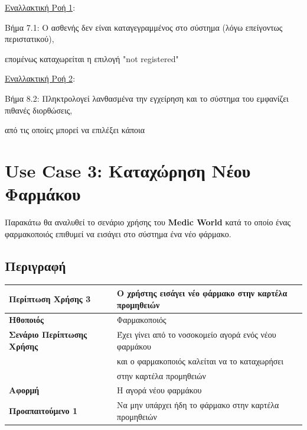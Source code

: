 \documentclass{article}
\newcommand\T{\rule{0pt}{2.6ex}}       %
\newcommand\B{\rule[-1.2ex]{0pt}{0pt}}
\begin{document}
\newpage
 
\underline{Εναλλακτική Ροή 1}: \vspace{0.005cm} \\
\par Βήμα 7.1: O ασθενής δεν είναι καταγεγραμμένος στο σύστημα (λόγω επείγοντως περιστατικού), \par επομένως καταχωρείται η επιλογή "not registered"

\vspace{0.3cm}

\underline{Εναλλακτική Ροή 2}: \vspace{0.005cm} \\
\par Βήμα 8.2: Πληκτρολογεί λανθασμένα την εγχείρηση και το σύστημα του εμφανίζει πιθανές διορθώσεις, \par από τις οποίες μπορεί να επιλέξει κάποια 

 

\section{Use Case 3: Καταχώρηση Νέου Φαρμάκου }
 
 Παρακάτω θα αναλυθεί το σενάριο χρήσης του \textbf{Medic World} κατά το οποίο ένας φαρμακοποιός επιθυμεί να εισάγει στο σύστημα ένα νέο φάρμακο.
 
\subsection{Περιγραφή}

\begin{center}
     \begin{tabular}{|l|l|}
     \hline
      \textbf{Περίπτωση Χρήσης 3} & Ο χρήστης εισάγει νέο φάρμακο στην καρτέλα προμηθειών \T\B \\ 
      \hline
      \textbf{Ηθοποιός} & Φαρμακοποιός \T\B \\
      \hline
      \textbf{Σενάριο Περίπτωσης Χρήσης} & Έχει γίνει από το νοσοκομείο αγορά ενός νέου φαρμάκου \T \\& και ο φαρμακοποιός καλείται να το καταχωρήσει \\& στην καρτέλα προμηθειών \B \\
      \hline
      \textbf{Αφορμή} & Η αγορά νέου φαρμάκου \T\B \\
      \hline
      \textbf{Προαπαιτούμενο 1} &  Να μην υπάρχει ήδη το φάρμακο στην καρτέλα προμηθειών \T\B \\
      \hline
     \end{tabular}
 \end{center}
 
\end{document}
